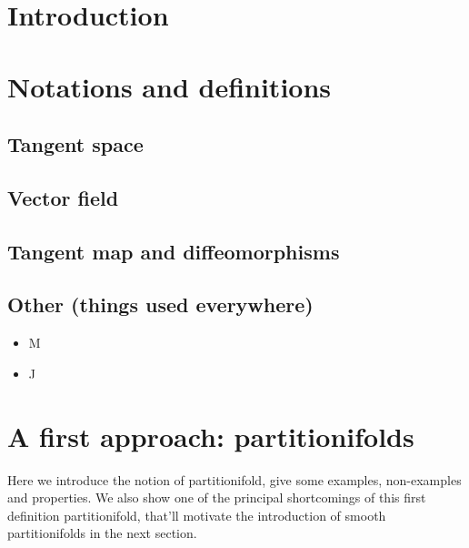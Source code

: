 



\section{Introduction}


\section{Notations and definitions}


	\subsection{Tangent space}

	\subsection{Vector field}

	\subsection{Tangent map and diffeomorphisms}

	\subsection{Other (things used everywhere)}


		\begin{itemize}
			\item M
			\item J
		\end{itemize}


\section{A first approach: partitionifolds}

	Here we introduce the notion of partitionifold, give some examples, non-examples and properties. We also show {\color{Red}one of the principal shortcomings} of this first definition partitionifold, that'll motivate the introduction of smooth partitionifolds in the next section.

